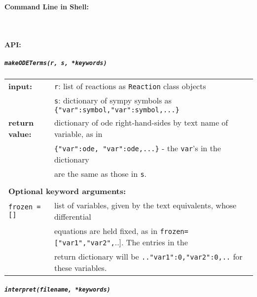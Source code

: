 \paragraph{Command Line in Shell:}\ \\



\paragraph{API:\\}

\subparagraph{\tt makeODETerms(r, s, *keywords)\\}

\begin{tabular}{ll}
\textbf{input:} & {\tt r}: list of reactions as {\tt Reaction} class objects\\
 & {\tt s}: dictionary of sympy symbols as \verb!{"var":symbol,"var":symbol,...}!\\

\textbf{return value:}& dictionary of ode right-hand-sides by text name of variable, as in \\
& \verb!{"var":ode, "var":ode,...}! - the {\tt var}'s in the dictionary\\
& are the same as those in {\tt s}. \\ \\
\multicolumn{2}{l}{\textbf{Optional keyword arguments:}}\\
\tt{frozen = []} & list of variables, given by the text equivalents, whose differential \\
& equations are held fixed, as in \verb.frozen=["var1","var2",...]. The entries in the \\
& return dictionary will be \verb!.."var1":0,"var2":0,..! for these variables.
\end{tabular}

\subparagraph{\tt interpret(filename, *keywords)\\}

